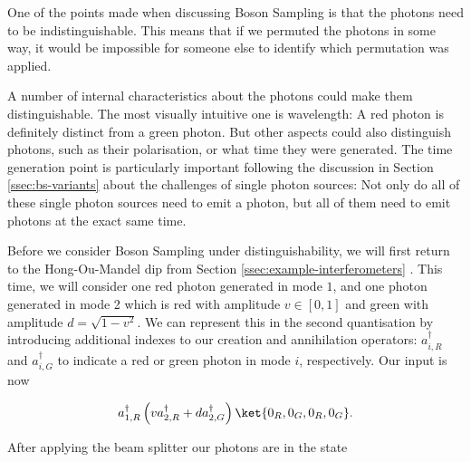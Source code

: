 One of the points made when discussing Boson Sampling is that the photons need to be indistinguishable. This means that if we permuted the photons in some way, it would be impossible for someone else to identify which permutation was applied.

A number of internal characteristics about the photons could make them distinguishable. The most visually intuitive one is wavelength: A red photon is definitely distinct from a green photon. But other aspects could also distinguish photons, such as their polarisation, or what time they were generated. The time generation point is particularly important following the discussion in Section \ref{ssec:bs-variants} about the challenges of single photon sources: Not only do all of these single photon sources need to emit a photon, but all of them need to emit photons at the exact same time.

Before we consider Boson Sampling under distinguishability, we will first return to the Hong-Ou-Mandel dip from Section \ref{ssec:example-interferometers} \cite{hong1987}. This time, we will consider one red photon generated in mode $1$, and one photon generated in mode 2 which is red with amplitude $v \in [0,1]$ and green with amplitude $d=\sqrt{1-v^2}$. We can represent this in the second quantisation by introducing additional indexes to our creation and annihilation operators: $a_{i,R}^\dagger$ and $a_{i,G}^\dagger$ to indicate a red or green photon in mode $i$, respectively. Our input is now

\begin{equation}
a_{1,R}^\dagger\left(v a_{2,R}^\dagger + da_{2,G}^\dagger\right)\ket{0_R,0_G,0_R,0_G}.
\end{equation}

After applying the beam splitter our photons are in the state


